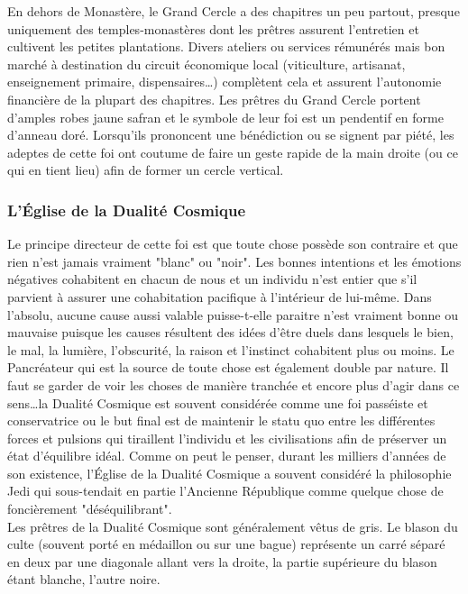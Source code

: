 \documentclass[twoside]{article}
\begin{document}
En dehors de Monastère, le Grand Cercle a des chapitres un peu partout, presque uniquement des temples-monastères dont les prêtres assurent l'entretien et cultivent les petites plantations. Divers ateliers ou services rémunérés mais bon marché à destination du circuit économique local (viticulture, artisanat, enseignement primaire, dispensaires\ldots) complètent cela et assurent l'autonomie financière de la plupart des chapitres. Les prêtres du Grand Cercle portent d'amples robes jaune safran et le symbole de leur foi est un pendentif en forme d'anneau doré. Lorsqu'ils prononcent une bénédiction ou se signent par piété, les adeptes de cette foi ont coutume de faire un geste rapide de la main droite (ou ce qui en tient lieu) afin de former un cercle vertical.

\subsubsection{L'Église de la Dualité Cosmique}
Le principe directeur de cette foi est que toute chose possède son contraire et que rien n'est jamais vraiment "blanc" ou "noir". Les bonnes intentions et les émotions négatives cohabitent en chacun de nous et un individu n'est entier que s'il parvient à assurer une cohabitation pacifique à l'intérieur de lui-même. Dans l'absolu, aucune cause aussi valable puisse-t-elle paraitre n'est vraiment bonne ou mauvaise puisque les causes résultent des idées d'être duels dans lesquels le bien, le mal, la lumière, l'obscurité, la raison et l'instinct cohabitent plus ou moins. Le Pancréateur qui est la source de toute chose est également double par nature. Il faut se garder de voir les choses de manière tranchée et encore plus d'agir dans ce sens\ldots la Dualité Cosmique est souvent considérée comme une foi passéiste et conservatrice ou le but final est de maintenir le statu quo entre les différentes forces et pulsions qui tiraillent l'individu et les civilisations afin de préserver un état d'équilibre idéal. Comme on peut le penser, durant les milliers d'années de son existence, l'Église de la Dualité Cosmique a souvent considéré la philosophie Jedi qui sous-tendait en partie l'Ancienne République comme quelque chose de foncièrement "déséquilibrant".\\

Les prêtres de la Dualité Cosmique sont généralement vêtus de gris. Le blason du culte (souvent porté en médaillon ou sur une bague) représente un carré séparé en deux par une diagonale allant vers la droite, la partie supérieure du blason étant blanche, l'autre noire.\\
\end{document}
